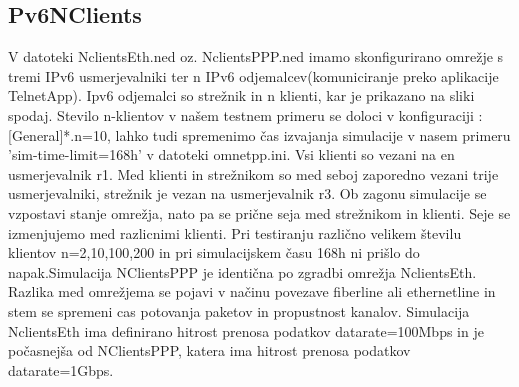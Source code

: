 \documentclass[11pt,a4paper,slovene]{myarticle}
\begin{document}
\subsection{Pv6NClients}
V datoteki NclientsEth.ned oz. NclientsPPP.ned imamo skonfigurirano omrežje s tremi IPv6 usmerjevalniki ter n IPv6 odjemalcev(komuniciranje preko aplikacije TelnetApp). Ipv6 odjemalci so strežnik in n klienti, kar je prikazano na sliki spodaj. Stevilo n-klientov v našem testnem primeru se doloci v konfiguraciji :[General]*.n=10, lahko tudi spremenimo čas izvajanja simulacije v nasem primeru 'sim-time-limit=168h' v datoteki omnetpp.ini. Vsi klienti so vezani na en usmerjevalnik r1. Med klienti in strežnikom so med seboj zaporedno vezani trije usmerjevalniki, strežnik je vezan na usmerjevalnik r3. Ob zagonu simulacije se vzpostavi stanje omrežja, nato pa se prične seja med strežnikom in klienti. Seje se izmenjujemo med razlicnimi klienti. Pri testiranju različno velikem številu klientov n=2,10,100,200 in pri simulacijskem času 168h ni prišlo do napak.Simulacija NClientsPPP je identična po zgradbi omrežja NclientsEth.
Razlika med omrežjema se pojavi v načinu povezave fiberline ali ethernetline in stem se spremeni cas potovanja paketov in propustnost kanalov.
Simulacija NclientsEth ima definirano hitrost prenosa podatkov datarate=100Mbps in je počasnejša od NClientsPPP, katera ima hitrost prenosa podatkov datarate=1Gbps.
\end{document}
